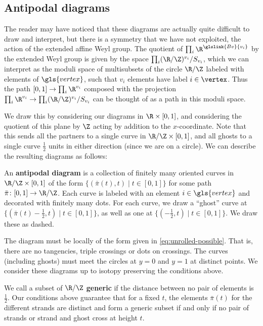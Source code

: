\subsection{Antipodal diagrams}
\label{sec:antipodal-diagrams}

  The reader may have noticed that these diagrams are actually quite
  difficult to draw and interpret, but there is a symmetry that we
  have not exploited, the action of the extended affine Weyl group.
  The quotient of $\prod_i\R^{\glslink{Bv}{v_i}}$ by the extended Weyl group is
  given by the space $\prod_i (\R/\Z)^{v_i}/S_{v_i}$, which we can
  interpret as the moduli space of multisubsets of the circle $\R/\Z$
  labeled with elements of ${\gls{vertex}}$, such that $v_i$ elements have label $i\in {\vertex}$.
  Thus the path $[0,1]\to \prod_i\R^{v_i}$ composed
  with the projection $\prod_i\R^{v_i}\to \prod_i
  (\R/\Z)^{v_i}/S_{v_i}$ can be thought of as a path in 
  this moduli space.

  We draw this by considering our diagrams in $\R\times [0,1]$, and
  considering the quotient of this plane by $\Z$ acting by addition to
  the $x$-coordinate.  Note that this sends all the partners to
  a single curve in  $\R/\Z\times [0,1]$, and all  ghosts
  to a single curve $\frac{1}{2}$ units in either direction (since we
  are on a circle).  We can describe the
  resulting diagrams as follows:

 \begin{definition}\label{def:cyl-BFN}
  An {\bf antipodal diagram} is a collection of finitely many
  oriented curves in $\R/\Z\times [0,1]$ of the form
  $\{(\bar{\pi}(t),t)\mid t\in [0,1]\}$ for some path $\bar{\pi}\colon
  [0,1]\to \R/\Z$.
  Each curve is labeled with an element $i\in {\gls{vertex}}$ and decorated with
  finitely many dots.  For each curve, we draw a ``ghost'' curve at
  $\{(\bar{\pi}(t)-\frac{1}{2},t)\mid t\in [0,1]\}$, as well as one at
  $\{(-\frac{1}{2},t)\mid t\in [0,1]\}$. 
  We draw these as dashed.

  The diagram must be locally of the
  form given in \eqref{eq:unrolled-possible}.
That is, there are no tangencies, triple crossings or dots on
crossings.  The curves (including ghosts) must
meet the circles at
$y=0$ and $y=1$ at distinct points. We consider these
diagrams 
up to isotopy preserving the conditions above.  
\end{definition}

We call a subset of $\R/\Z$ {\bf generic} if the distance between no pair of elements is $\frac{1}{2}$.  Our conditions above guarantee that for a fixed $t$, the elements $\bar{\pi}(t)$ for the different strands are distinct and form a generic subset if and only if no pair of strands or strand and ghost cross at height $t$.

